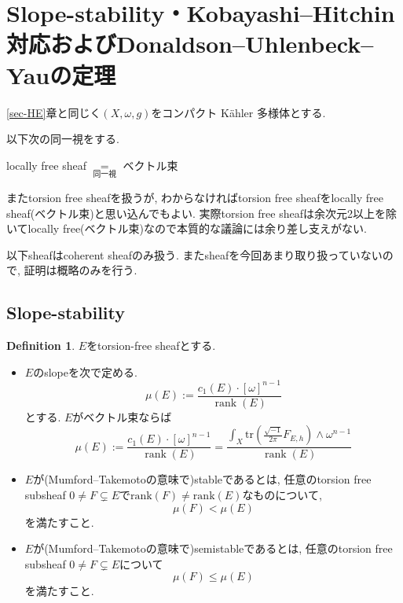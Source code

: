\documentclass[dvipdfmx,a4paper,11pt]{article} %
\theoremstyle{definition}
\newtheorem{defn}[thm]{Definition}
\theoremstyle{remark}
\numberwithin{equation}{section}
\begin{document}
\newpage
\section{Slope-stability・Kobayashi--Hitchin対応およびDonaldson--Uhlenbeck--Yauの定理}
\label{sec-slope}
\ref{sec-HE}章と同じく$(X, \omega, g)$をコンパクト Kähler 多様体とする. 

\begin{tcolorbox}[mybox]
以下次の同一視をする.
\begin{center}
locally free sheaf 
$\underset{\text{同一視}}{=}$ ベクトル束
\end{center}
\end{tcolorbox}
またtorsion free sheafを扱うが, わからなければtorsion free sheafをlocally free sheaf(ベクトル束)と思い込んでもよい. 実際torsion free sheafは余次元2以上を除いてlocally free(ベクトル束)なので本質的な議論には余り差し支えがない. 

以下sheafはcoherent sheafのみ扱う. 
またsheafを今回あまり取り扱っていないので, 証明は概略のみを行う. 



\subsection{Slope-stability}

\begin{defn}
$E$をtorsion-free sheafとする. 
\begin{itemize}
\item $E$のslopeを次で定める. 
$$
\mu(E):=
\frac{c_1(E) \cdot[\omega]^{n-1}}{\operatorname{rank} (E)}
$$
とする. $E$がベクトル束ならば
$$
\mu(E):=
\frac{c_1(E) \cdot [\omega]^{n-1}}{\operatorname{rank} (E)}
=
\frac{\int_{X}\mathrm{tr} \left(\frac{\sqrt{-1}}{2\pi}F_{E,h}\right) \wedge \omega^{n-1}}{\operatorname{rank} (E)}
$$
\item $E$が(Mumford--Takemotoの意味で)stableであるとは, 任意のtorsion free subsheaf $0 \neq F \subsetneq E$で$\mathrm{rank}(F) \neq \mathrm{rank}(E)$なものについて, 
$$
\mu(F) < \mu(E)
$$
を満たすこと.
\item $E$が(Mumford--Takemotoの意味で)semistableであるとは, 任意のtorsion free subsheaf $0 \neq F \subsetneq E$について
$$
\mu(F) \le \mu(E)
$$
を満たすこと.
\end{itemize}
\end{defn}
\end{document}
